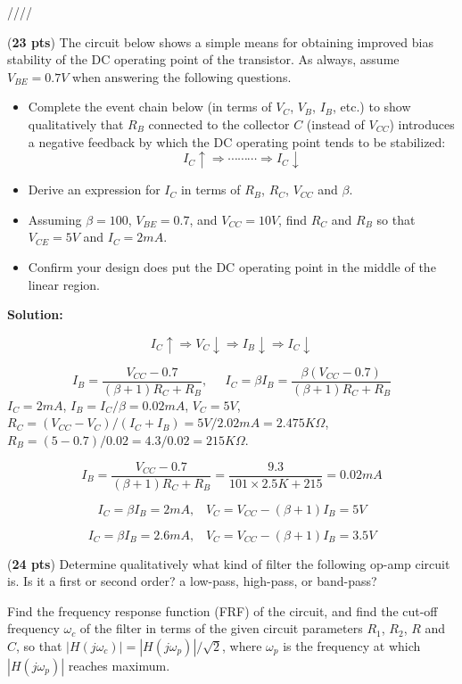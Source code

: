 ////


\item ({\bf 23 pts})
  The circuit below shows a simple means for obtaining improved bias
  stability of the DC operating point of the transistor. As always,
  assume $V_{BE}=0.7V$ when answering the following questions.


  \begin{itemize}
  \item Complete the event chain below (in terms of $V_C$, $V_B$, $I_B$,
    etc.) to show qualitatively that $R_B$ connected to the collector $C$ 
    (instead of $V_{CC}$) introduces a negative feedback by which the DC
    operating point tends to be stabilized:
    \[
    I_C \uparrow \Longrightarrow \cdots\cdots\cdots \Longrightarrow I_C \downarrow     
    \]
  \item Derive an expression for $I_C$ in terms of $R_B$, $R_C$, $V_{CC}$
    and $\beta$.
  \item Assuming $\beta=100$, $V_{BE}=0.7$, and $V_{CC}=10V$, find $R_C$ 
    and $R_B$ so that $V_{CE}=5V$ and $I_C=2mA$.
  \item Confirm your design does put the DC operating point in the middle
    of the linear region.
  \end{itemize}


  {\bf Solution:}

  \[
  I_C \uparrow \Longrightarrow V_C \downarrow
  \Longrightarrow I_B \downarrow \Longrightarrow I_C \downarrow 
  \]

  \[
  I_B=\frac{V_{CC}-0.7}{(\beta+1)R_C+R_B},\;\;\;\;\;
  I_C=\beta I_B=\frac{\beta(V_{CC}-0.7)}{(\beta+1)R_C+R_B} 
  \]
  $I_C=2mA$, $I_B=I_C/\beta=0.02mA$, $V_C=5V$,
  $R_C=(V_{CC}-V_C)/(I_C+I_B)=5V/2.02mA=2.475K\Omega$,  
  $R_B=(5-0.7)/0.02=4.3/0.02=215K\Omega$.

  \[
  I_B=\frac{V_{CC}-0.7}{(\beta+1)R_C+R_B}=\frac{9.3}{101\times 2.5K+215}
  =0.02mA
  \]

  \[
  I_C=\beta I_B=2 mA,\;\;\;V_C=V_{CC}-(\beta+1)I_B=5V 
  \]

  \[
  I_C=\beta I_B=2.6mA,\;\;\;V_C=V_{CC}-(\beta+1)I_B=3.5V 
  \]

\item ({\bf 24 pts})
  Determine qualitatively what kind of filter the following op-amp
  circuit is. Is it a first or second order? a low-pass, high-pass, or 
  band-pass? 

  Find the frequency response function (FRF) of the circuit, and find the
  cut-off frequency $\omega_c$ of the filter in terms of the given circuit
  parameters $R_1$, $R_2$, $R$ and $C$, so that
  $|H(j\omega_c)|=|H(j\omega_p)|/\sqrt{2}$, where $\omega_p$ is the
  frequency at which $|H(j\omega_p)|$ reaches maximum.

